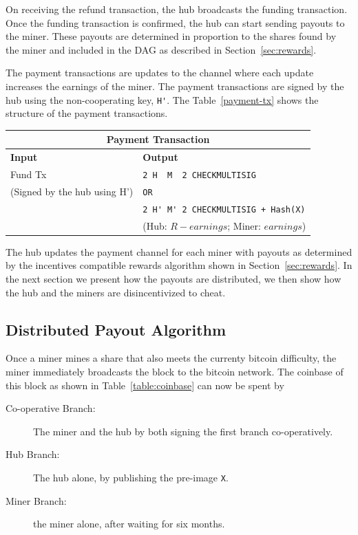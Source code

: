 \documentclass{article}
\begin{document}
On receiving the refund transaction, the hub broadcasts the funding
transaction. Once the funding transaction is confirmed, the hub can
start sending payouts to the miner. These payouts are determined in
proportion to the shares found by the miner and included in the DAG as
described in Section~\ref{sec:rewards}.

The payment transactions are updates to the channel where each update
increases the earnings of the miner. The payment transactions are
signed by the hub using the non-cooperating key, \verb|H'|. The
Table~\ref{payment-tx} shows the structure of the payment
transactions.

\begin{center}
  \begin{tabular}{ ll }
    \multicolumn{2}{c}{\bfseries Payment Transaction} \\
    \midrule
    \bfseries Input & \bfseries Output \\
    \midrule
    Fund Tx & \verb|2 H  M  2 CHECKMULTISIG| \\
    (Signed by the hub using H') & \verb|OR| \\
                    & \verb|2 H' M' 2 CHECKMULTISIG + Hash(X)| \\
                    & (Hub: $R - earnings$; Miner: $earnings$) \\
    \midrule
  \end{tabular}
\end{center}

The hub updates the payment channel for each miner with payouts as
determined by the incentives compatible rewards algorithm shown in
Section~\ref{sec:rewards}. In the next section we present how the
payouts are distributed, we then show how the hub and the miners are
disincentivized to cheat.

\subsection{Distributed Payout Algorithm}

Once a miner mines a share that also meets the currenty bitcoin
difficulty, the miner immediately broadcasts the block to the bitcoin
network. The coinbase of this block as shown in
Table~\ref{table:coinbase} can now be spent by

\begin{description}
\item[Co-operative Branch:] The miner and the hub by both signing the
  first branch co-operatively.
\item[Hub Branch:] The hub alone, by publishing the pre-image \verb|X|.
\item[Miner Branch:] the miner alone, after waiting for six months.
\end{description}
\end{document}
